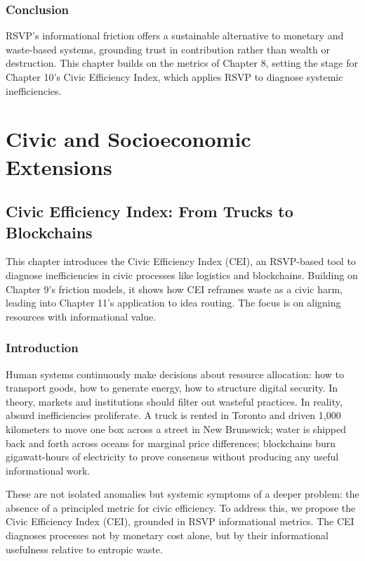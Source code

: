 \documentclass{book}
\begin{document}
\section{Conclusion}

RSVP’s informational friction offers a sustainable alternative to monetary and waste-based systems, grounding trust in contribution rather than wealth or destruction. This chapter builds on the metrics of Chapter 8, setting the stage for Chapter 10’s Civic Efficiency Index, which applies RSVP to diagnose systemic inefficiencies.

\part{Civic and Socioeconomic Extensions}

\chapter{Civic Efficiency Index: From Trucks to Blockchains}

This chapter introduces the Civic Efficiency Index (CEI), an RSVP-based tool to diagnose inefficiencies in civic processes like logistics and blockchains. Building on Chapter 9’s friction models, it shows how CEI reframes waste as a civic harm, leading into Chapter 11’s application to idea routing. The focus is on aligning resources with informational value.

\section{Introduction}

Human systems continuously make decisions about resource allocation: how to transport goods, how to generate energy, how to structure digital security. In theory, markets and institutions should filter out wasteful practices. In reality, absurd inefficiencies proliferate. A truck is rented in Toronto and driven 1,000 kilometers to move one box across a street in New Brunswick; water is shipped back and forth across oceans for marginal price differences; blockchains burn gigawatt-hours of electricity to prove consensus without producing any useful informational work.

These are not isolated anomalies but systemic symptoms of a deeper problem: the absence of a principled metric for civic efficiency. To address this, we propose the Civic Efficiency Index (CEI), grounded in RSVP informational metrics. The CEI diagnoses processes not by monetary cost alone, but by their informational usefulness relative to entropic waste.
\end{document}

